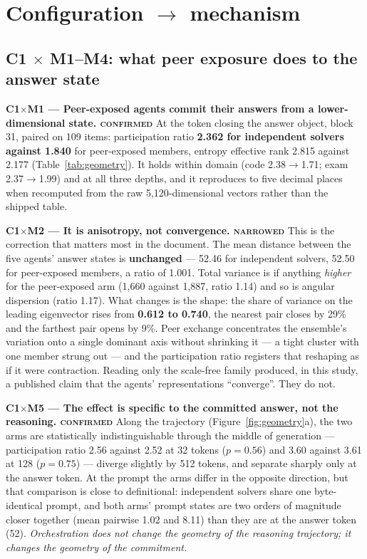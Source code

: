 \documentclass[10pt,a4paper]{article}
\newcommand{\ax}[1]{\textcolor{accent}{\textbf{#1}}}
\newcommand{\mx}[1]{\textbf{#1}}
\newcommand{\trend}[1]{\medskip\noindent\textbf{#1}\quad}
\begin{document}
\section{Configuration \texorpdfstring{$\to$}{->} mechanism}\label{sec:cm}

\subsection{\ax{C1} \texorpdfstring{$\times$}{x} \mx{M1}--\mx{M4}: what peer exposure does to the answer state}

\trend{\ax{C1}$\times$\mx{M1} --- Peer-exposed agents commit their answers from a lower-dimensional state. \textsc{confirmed}}
At the token closing the answer object, block 31, paired on 109 items: participation ratio \textbf{2.362 for independent solvers against 1.840} for peer-exposed members, entropy effective rank 2.815 against 2.177 (Table~\ref{tab:geometry}). It holds within domain (code 2.38$\to$1.71; exam 2.37$\to$1.99) and at all three depths, and it reproduces to five decimal places when recomputed from the raw 5{,}120-dimensional vectors rather than the shipped table.

\trend{\ax{C1}$\times$\mx{M2} --- It is anisotropy, not convergence. \textsc{narrowed}}
This is the correction that matters most in the document. The mean distance between the five agents' answer states is \textbf{unchanged} --- 52.46 for independent solvers, 52.50 for peer-exposed members, a ratio of 1.001. Total variance is if anything \emph{higher} for the peer-exposed arm (1{,}660 against 1{,}887, ratio 1.14) and so is angular dispersion (ratio 1.17). What changes is the shape: the share of variance on the leading eigenvector rises from \textbf{0.612 to 0.740}, the nearest pair closes by 29\% and the farthest pair opens by 9\%. Peer exchange concentrates the ensemble's variation onto a single dominant axis without shrinking it --- a tight cluster with one member strung out --- and the participation ratio registers that reshaping as if it were contraction. Reading only the scale-free family produced, in this study, a published claim that the agents' representations ``converge''. They do not.

\trend{\ax{C1}$\times$\mx{M5} --- The effect is specific to the committed answer, not the reasoning. \textsc{confirmed}}
Along the trajectory (Figure~\ref{fig:geometry}a), the two arms are statistically indistinguishable through the middle of generation --- participation ratio 2.56 against 2.52 at 32 tokens ($p=0.56$) and 3.60 against 3.61 at 128 ($p=0.75$) --- diverge slightly by 512 tokens, and separate sharply only at the answer token. At the prompt the arms differ in the opposite direction, but that comparison is close to definitional: independent solvers share one byte-identical prompt, and both arms' prompt states are two orders of magnitude closer together (mean pairwise 1.02 and 8.11) than they are at the answer token (52). \emph{Orchestration does not change the geometry of the reasoning trajectory; it changes the geometry of the commitment.}
\end{document}
